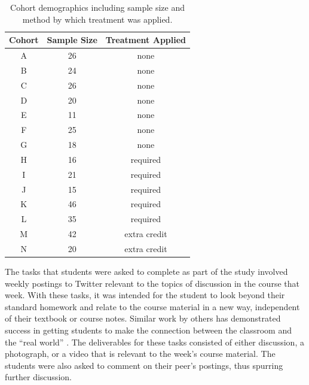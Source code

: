 \documentclass[12pt]{article}
\begin{document}
\begin{table}[H]
\caption{Cohort demographics including sample size and method by which treatment was applied.}
\begin{center}
\label{cohortDemo}
\begin{tabular}{ccc}
\hline
 Cohort & Sample Size & Treatment Applied \\
\hline
 A & 26 & none \\ 
 B & 24 & none \\ 
 C & 26 & none \\ 
 D & 20 & none \\ 
 E & 11 & none \\ 
 F & 25 & none \\
 G & 18 & none \\
 H & 16 & required \\ 
 I & 21 & required \\ 
 J & 15 & required \\ 
 K & 46 & required \\ 
 L & 35 & required \\ 
 M & 42 & extra credit \\ 
 N & 20 & extra credit \\ 
\hline
\end{tabular}
\end{center}
\end{table}

The tasks that students were asked to complete as part of the study involved weekly postings to Twitter relevant to the topics of discussion in the course that week. With these tasks, it was intended for the student to look beyond their standard homework and relate to the course material in a new way, independent of their textbook or course notes. Similar work by others has demonstrated success in getting students to make the connection between the classroom and the ``real world'' \cite{hopp_journal_2008}. The deliverables for these tasks consisted of either discussion, a photograph, or a video that is relevant to the week's course material. The students were also asked to comment on their peer's postings, thus spurring further discussion.
\end{document}
